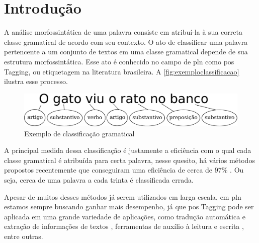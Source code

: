 \chapter{Introdução}\label{introducao}

A análise morfossintática de uma palavra consiste em atribuí-la à sua correta classe gramatical de acordo com seu contexto. O ato de classificar uma palavra pertencente a um conjunto de textos em uma classe gramatical depende de sua estrutura morfossintática. Esse ato é conhecido no campo de \ac{pln} como \ac{pos} Tagging, ou etiquetagem na literatura brasileira. A \autoref{fig:exemploclassificacao} ilustra esse processo. 

\begin{figure}[htb]
  \caption{Exemplo de classificação gramatical}\label{fig:exemploclassificacao}
  \begin{center}
      \includegraphics[scale=0.75]{img/exemploclassificacao.pdf}
  \end{center}
\end{figure}



A principal medida dessa classificação é justamente a eficiência com o qual cada classe gramatical é atribuída para certa palavra, nesse quesito, há vários métodos propostos recentemente que conseguiram uma eficiência de cerca de 97\% \cite{dos2014training, collobert2011deep, fonseca2015evaluating}. Ou seja, cerca de uma palavra a cada trinta é classificada errada. 

Apesar de muitos desses métodos já serem utilizados em larga escala, em \ac{pln} estamos sempre buscando ganhar mais desempenho, já que \ac{pos} Tagging pode ser aplicada em uma grande variedade de aplicações, como tradução automática e extração de informações de textos \cite{manning1999foundations}, ferramentas de auxílio à leitura e escrita \cite{marquiafavel2010processo}, entre outras.



